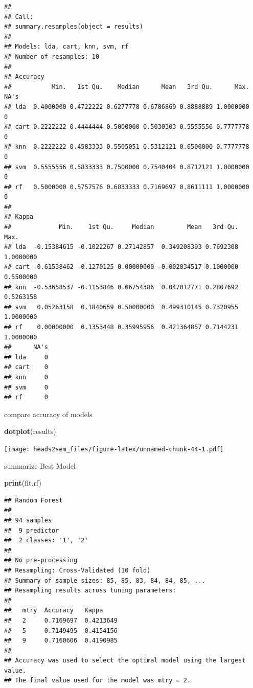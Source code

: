 \documentclass[]{book}
\newenvironment{Shaded}{\begin{snugshade}}{\end{snugshade}}
\newcommand{\KeywordTok}[1]{\textcolor[rgb]{0.13,0.29,0.53}{\textbf{#1}}}
\newcommand{\NormalTok}[1]{#1}
\begin{document}
\begin{verbatim}
## 
## Call:
## summary.resamples(object = results)
## 
## Models: lda, cart, knn, svm, rf 
## Number of resamples: 10 
## 
## Accuracy 
##           Min.   1st Qu.    Median      Mean   3rd Qu.      Max. NA's
## lda  0.4000000 0.4722222 0.6277778 0.6786869 0.8888889 1.0000000    0
## cart 0.2222222 0.4444444 0.5000000 0.5030303 0.5555556 0.7777778    0
## knn  0.2222222 0.4583333 0.5505051 0.5312121 0.6500000 0.7777778    0
## svm  0.5555556 0.5833333 0.7500000 0.7540404 0.8712121 1.0000000    0
## rf   0.5000000 0.5757576 0.6833333 0.7169697 0.8611111 1.0000000    0
## 
## Kappa 
##             Min.    1st Qu.     Median         Mean   3rd Qu.      Max.
## lda  -0.15384615 -0.1022267 0.27142857  0.349208393 0.7692308 1.0000000
## cart -0.61538462 -0.1270125 0.00000000 -0.002034517 0.1000000 0.5500000
## knn  -0.53658537 -0.1153846 0.06754386  0.047012771 0.2807692 0.5263158
## svm   0.05263158  0.1840659 0.50000000  0.499310145 0.7320955 1.0000000
## rf    0.00000000  0.1353448 0.35995956  0.421364857 0.7144231 1.0000000
##      NA's
## lda     0
## cart    0
## knn     0
## svm     0
## rf      0
\end{verbatim}

compare accuracy of models

\begin{Shaded}
\begin{Highlighting}[]
\KeywordTok{dotplot}\NormalTok{(results)}
\end{Highlighting}
\end{Shaded}

\texttt{[image: heads2sem\_files/figure-latex/unnamed-chunk-44-1.pdf]}

summarize Best Model

\begin{Shaded}
\begin{Highlighting}[]
\KeywordTok{print}\NormalTok{(fit.rf)}
\end{Highlighting}
\end{Shaded}

\begin{verbatim}
## Random Forest 
## 
## 94 samples
##  9 predictor
##  2 classes: '1', '2' 
## 
## No pre-processing
## Resampling: Cross-Validated (10 fold) 
## Summary of sample sizes: 85, 85, 83, 84, 84, 85, ... 
## Resampling results across tuning parameters:
## 
##   mtry  Accuracy   Kappa    
##   2     0.7169697  0.4213649
##   5     0.7149495  0.4154156
##   9     0.7160606  0.4190985
## 
## Accuracy was used to select the optimal model using the largest value.
## The final value used for the model was mtry = 2.
\end{verbatim}
\end{document}
